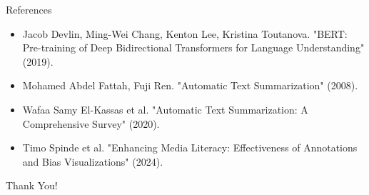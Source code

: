 \documentclass{beamer}
\begin{document}
\begin{frame}{References}
\begin{itemize}
    \item Jacob Devlin, Ming-Wei Chang, Kenton Lee, Kristina Toutanova. "BERT: Pre-training of Deep Bidirectional Transformers for Language Understanding" (2019).
    \item Mohamed Abdel Fattah, Fuji Ren. "Automatic Text Summarization" (2008).
    \item Wafaa Samy El-Kassas et al. "Automatic Text Summarization: A Comprehensive Survey" (2020).
    \item Timo Spinde et al. "Enhancing Media Literacy: Effectiveness of Annotations and Bias Visualizations" (2024).
\end{itemize}
\end{frame}

\begin{frame}
  \centering
  \Huge Thank You!
\end{frame}
\end{document}
